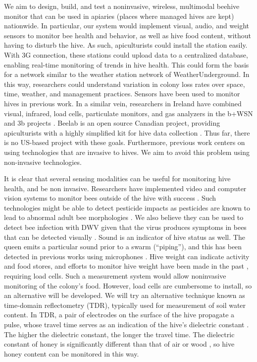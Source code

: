 We aim to design, build, and test a noninvasive, wireless, multimodal beehive monitor that can be used in apiaries (places where managed hives are kept) nationwide. In particular, our system would implement visual, audio, and weight sensors to monitor bee health and behavior, as well as hive food content, without having to disturb the hive. As such, apiculturists could install the station easily. With 3G connection, these stations could upload data to a centralized database, enabling real-time monitoring of trends in hive health. This could form the basis for a network similar to the weather station network of WeatherUnderground. In this way, researchers could understand variation in colony loss rates over space, time, weather, and management practices. Sensors have been used to monitor hives in previous work. In a similar vein, researchers in Ireland have combined visual, infrared, load cells, particulate monitors, and gas analyzers in the b+WSN and 3b projects \cite{murphy2015big, murphy2015b+wsn}. Beelab is an open source Canadian project, providing apiculturists with a highly simplified kit for hive data collection \cite{phillips2014testing}. Thus far, there is no US-based project with these goals. Furthermore, previous work centers on using technologies that are invasive to hives. We aim to avoid this problem using non-invasive technologies.

It is clear that several sensing modalities can be useful for monitoring hive health, and be non invasive. Researchers have implemented video and computer vision systems to monitor bees outside of the hive with success \cite{azarcoya2014automatic,steen2011portable}. Such technologies might be able to detect pesticide impacts as pesticides are known to lead to abnormal adult bee morphologies \cite{speybroeck2010weighing}. We also believe they can be used to detect bee infection with DWV given that the virus produces symptoms in bees that can be detected visually \cite{de2010deformed}. Sound is an indicator of hive status as well. The queen emits a particular sound prior to a swarm (“piping”), and this has been detected in previous works using microphones \cite{ferrari2008monitoring, eren1997electronic}. Hive weight can indicate activity and food stores, and efforts to monitor hive weight have been made in the past \cite{meikle2008within}, requiring load cells. Such a measurement system would allow noninvasive monitoring of the colony's food. However, load cells are cumbersome to install, so an alternative will be developed. We will try an alternative technique known as time-domain reflectometry (TDR), typically used for measurement of soil water content. In TDR, a pair of electrodes on the surface of the hive propagate a pulse, whose travel time serves as an indication of the hive's dielectric constant \cite{dalton1984time}. The higher the dielectric constant, the longer the travel time. The dielectric constant of honey is significantly different than that of air or wood \cite{guo2010sugar}, so hive honey content can be monitored in this way.

